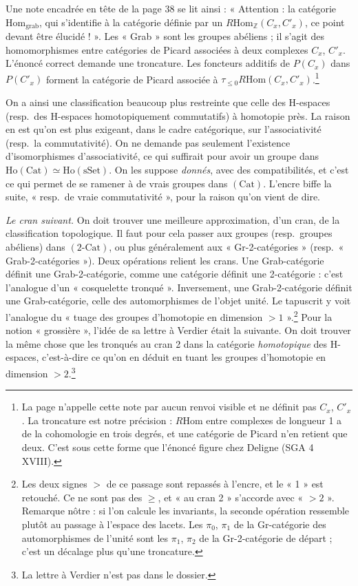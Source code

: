 \documentclass[11pt,a4paper]{article}
\begin{document}
Une note encadrée en tête de la page 38 se lit ainsi : « Attention : la
catégorie $\mathrm{Hom}_{\mathrm{grab}}$, qui s'identifie à la catégorie définie
par un $R\mathrm{Hom}_{\mathbb{Z}}(C_x, C'_x)$, ce point devant être élucidé !
». Les « Grab » sont les groupes abéliens ; il s'agit des homomorphismes entre
catégories de Picard associées à deux complexes $C_x$, $C'_x$. L'énoncé correct
demande une troncature. Les foncteurs additifs de $P(C_x)$ dans $P(C'_x)$
forment la catégorie de Picard associée à $\tau_{\leq 0}
R\mathrm{Hom}(C_x, C'_x)$.\footnote{La page n'appelle cette note par aucun
renvoi visible et ne définit pas $C_x$, $C'_x$. La troncature est notre
précision : $R\mathrm{Hom}$ entre complexes de longueur 1 a de la cohomologie
en trois degrés, et une catégorie de Picard n'en retient que deux. C'est sous
cette forme que l'énoncé figure chez Deligne (SGA 4 XVIII).}

On a ainsi une classification beaucoup plus restreinte que celle des
H-espaces (resp.\ des H-espaces homotopiquement commutatifs) à homotopie près.
La raison en est qu'on est plus exigeant, dans le cadre catégorique, sur
l'associativité (resp.\ la commutativité). On ne demande pas seulement
l'existence d'isomorphismes d'associativité, ce qui suffirait pour avoir un
groupe dans $\mathrm{Ho}(\mathrm{Cat}) \simeq \mathrm{Ho}(\mathrm{sSet})$. On
les suppose \emph{donnés}, avec des compatibilités, et c'est ce qui permet de
se ramener à de vrais groupes dans $(\mathrm{Cat})$. L'encre biffe la suite,
« resp.\ de vraie commutativité », pour la raison qu'on vient de dire.

\emph{Le cran suivant.} On doit trouver une meilleure approximation, d'un cran,
de la classification topologique. Il faut pour cela passer aux groupes
(resp.\ groupes abéliens) dans $(2\text{-Cat})$, ou plus généralement aux
« Gr-2-catégories » (resp.\ « Grab-2-catégories »). Deux opérations relient
les crans. Une Grab-catégorie définit une Grab-2-catégorie, comme une catégorie
définit une 2-catégorie : c'est l'analogue d'un « cosquelette tronqué ».
Inversement, une Grab-2-catégorie définit une Grab-catégorie, celle des
automorphismes de l'objet unité. Le tapuscrit y voit l'analogue du « tuage des
groupes d'homotopie en dimension $> 1$ ».\footnote{Les deux signes $>$ de ce
passage sont repassés à l'encre, et le « 1 » est retouché. Ce ne sont pas des
$\geq$, et « au cran 2 » s'accorde avec « $> 2$ ». Remarque nôtre : si l'on calcule les invariants, la seconde
opération ressemble plutôt au passage à l'espace des lacets. Les $\pi_0$,
$\pi_1$ de la Gr-catégorie des automorphismes de l'unité sont les $\pi_1$,
$\pi_2$ de la Gr-2-catégorie de départ ; c'est un décalage plus qu'une
troncature.} Pour la notion « grossière », l'idée de sa lettre à Verdier était
la suivante. On doit trouver la même chose que les tronqués au cran 2 dans la
catégorie \emph{homotopique} des H-espaces, c'est-à-dire ce qu'on en déduit en
tuant les groupes d'homotopie en dimension $> 2$.\footnote{La lettre à
Verdier n'est pas dans le dossier.}
\end{document}
